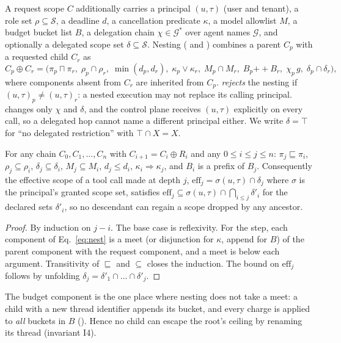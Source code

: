 A request scope $C$ additionally carries a principal $(u,\tau)$ (user and tenant), a role set $\rho\subseteq\mathcal{S}$, a deadline $d$, a cancellation predicate $\kappa$, a model allowlist $M$, a budget bucket list $B$, a delegation chain $\chi\in\mathcal{G}^*$ over agent names $\mathcal{G}$, and optionally a delegated scope set $\delta\subseteq\mathcal{S}$. Nesting ( and ) combines a parent $C_p$ with a requested child $C_r$ as
\begin{equation}
\label{eq:nest}
 C_p\oplus C_r=\bigl(\pi_p\sqcap\pi_r,\;\rho_p\cap\rho_r,\;\min(d_p,d_r),\;\kappa_p\vee\kappa_r,\;M_p\cap M_r,\;B_p\mathbin{+\!\!+}B_r,\;\chi_p\,g,\;\delta_p\cap\delta_r\bigr),
\end{equation}
where components absent from $C_r$ are inherited from $C_p$.  \emph{rejects} the nesting if $(u,\tau)_p\neq(u,\tau)_r$: a nested execution may not replace its calling principal.  changes only $\chi$ and $\delta$, and the control plane receives $(u,\tau)$ explicitly on every call, so a delegated hop cannot name a different principal either. We write $\delta=\top$ for ``no delegated restriction'' with $\top\cap X=X$.

\begin{theorem}
\label{thm:attenuation}
For any chain $C_0,C_1,\dots,C_n$ with $C_{i+1}=C_i\oplus R_i$ and any $0\le i\le j\le n$: $\pi_j\sqsubseteq\pi_i$, $\rho_j\subseteq\rho_i$, $\delta_j\subseteq\delta_i$, $M_j\subseteq M_i$, $d_j\le d_i$, $\kappa_i\Rightarrow\kappa_j$, and $B_i$ is a prefix of $B_j$. Consequently the effective scope of a tool call made at depth $j$, $\mathrm{eff}_j=\sigma(u,\tau)\cap\delta_j$ where $\sigma$ is the principal's granted scope set, satisfies $\mathrm{eff}_j\subseteq\sigma(u,\tau)\cap\bigcap_{i\le j}\delta'_i$ for the declared sets $\delta'_i$, so no descendant can regain a scope dropped by any ancestor.
\end{theorem}
\begin{proof}
By induction on $j-i$. The base case is reflexivity. For the step, each component of Eq.~\eqref{eq:nest} is a meet (or disjunction for $\kappa$, append for $B$) of the parent component with the request component, and a meet is below each argument. Transitivity of $\sqsubseteq$ and $\subseteq$ closes the induction. The bound on $\mathrm{eff}_j$ follows by unfolding $\delta_j=\delta'_1\cap\dots\cap\delta'_j$.
\end{proof}
The budget component is the one place where nesting does not take a meet: a child with a new thread identifier appends its bucket, and every charge is applied to \emph{all} buckets in $B$ (). Hence no child can escape the root's ceiling by renaming its thread (invariant I4).

